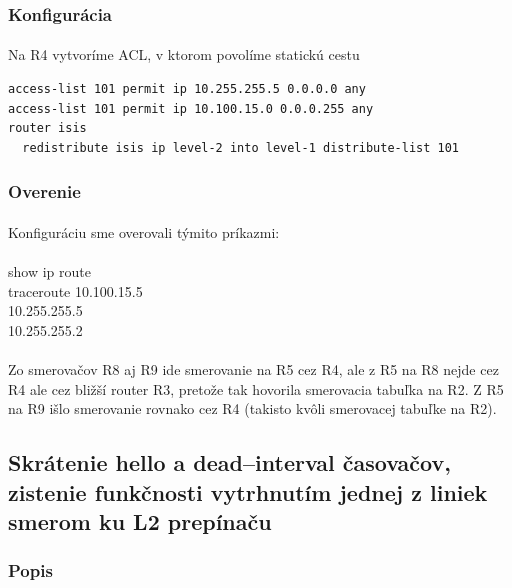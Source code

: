 \documentclass[12pt,twoside,a4paper]{report}
\begin{document}
\subsubsection{Konfigurácia}
\paragraph{}
Na R4 vytvoríme ACL, v ktorom povolíme statickú cestu

\noindent
{\selectfont
\begin{small}
\begin{verbatim}
access-list 101 permit ip 10.255.255.5 0.0.0.0 any
access-list 101 permit ip 10.100.15.0 0.0.0.255 any
router isis
  redistribute isis ip level-2 into level-1 distribute-list 101

\end{verbatim}
\end{small}
}

\subsubsection{Overenie}
\paragraph{}
Konfiguráciu sme overovali týmito príkazmi:\\
\\
show ip route\\
traceroute 10.100.15.5\\
10.255.255.5\\
10.255.255.2

\paragraph{}
Zo smerovačov R8 aj R9 ide smerovanie na R5 cez R4, ale z R5 na R8 nejde cez R4 ale cez bližší router R3, pretože tak hovorila smerovacia tabuľka na R2. Z R5 na R9 išlo smerovanie rovnako cez R4 (takisto kvôli smerovacej tabuľke na R2).





\subsection{Skrátenie hello a dead–interval časovačov, zistenie funkčnosti vytrhnutím jednej z liniek smerom ku L2 prepínaču}
\subsubsection{Popis}
\end{document}
